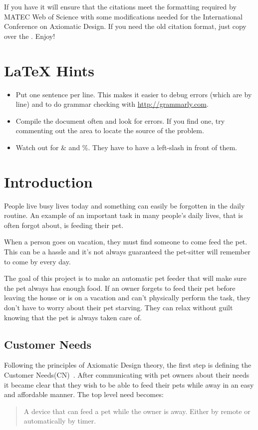 \documentclass[twocolumn]{webofc}
\begin{document}
        If you have  it will ensure that the citations meet the formatting required by MATEC Web of Science with some modifications needed for the International Conference on Axiomatic Design.
        If you need the old citation format, just copy  over the .
        Enjoy!


\listoffixmes{}

\section*{\LaTeX{} Hints}
\begin{itemize}
\item Put one sentence per line.
  This makes it easier to debug errors (which are by line) and to do grammar checking with \url{http://grammarly.com}.
\item Compile the document often and look for errors.
  If you find one, try commenting out the area to locate the source of the problem.
\item Watch out for \& and \%.  They have to have a left-slash in front of them.
\end{itemize}

\section{Introduction}
People live busy lives today and something can easily be forgotten in the daily routine.
An example of an important task in many people’s daily lives, that is often forgot about, is feeding their pet.

When a person goes on vacation, they must find someone to come feed the pet.
This can be a hassle and it’s not always guaranteed the pet-sitter will remember to come by every day.

The goal of this project is to make an automatic pet feeder that will make sure the pet always has enough food.
If an owner forgets to feed their pet before leaving the house or is on a vacation and can’t physically perform the task, they don’t have to worry about their pet starving.
They can relax without guilt knowing that the pet is always taken care of. 

\subsection{Customer Needs}
Following the principles of Axiomatic Design theory, the first step is defining the Customer Needs(CN)~\cite{suh1990principles}.
After communicating with pet owners about their needs it became clear that they wish to be able to feed their pets while away in an easy and affordable manner.
The top level need  becomes:
\begin{quote} \textbf{} A device that can feed a pet while the owner is away. Either by remote or automatically by timer.
\end{quote}
\end{document}
